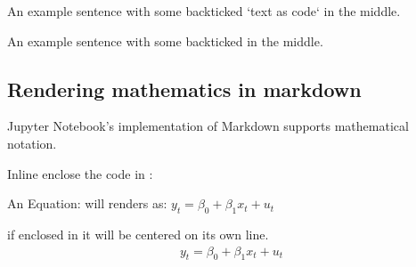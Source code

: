 \documentclass[letterpaper,10pt,english]{jupyterBook}
\begin{document}
\sphinxAtStartPar
{}

\sphinxAtStartPar
An example sentence with some back\sphinxhyphen{}ticked `text as code` in the middle.

\sphinxAtStartPar
{}

\sphinxAtStartPar
An example sentence with some back\sphinxhyphen{}ticked  in the middle.


\subsection{Rendering mathematics in markdown}
\label{\detokenize{content/04_PythonEssentials/Intro_Jupyter_notebook:rendering-mathematics-in-markdown}}
\sphinxAtStartPar
Jupyter Notebook’s implementation of Markdown supports  mathematical notation.

\sphinxAtStartPar
Inline enclose the  code in \sphinxcode{\sphinxupquote{\$}}:

\sphinxAtStartPar
An Equation:  will renders as: \(y_t = \beta_0 + \beta_1 x_t + u_t\)

\sphinxAtStartPar
if enclosed in \sphinxcode{\sphinxupquote{\$\$}} \sphinxcode{\sphinxupquote{\$\$}} it will be centered on its own line.
\begin{equation*}
\begin{split}y_t = \beta_0 + \beta_1 x_t + u_t\end{split}
\end{equation*}
\end{document}

